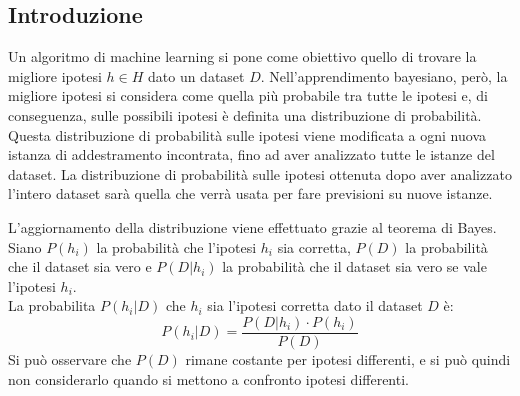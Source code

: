 \subsection{Introduzione}
Un algoritmo di machine learning si pone come obiettivo quello di trovare la
migliore ipotesi $h \in H$ dato un dataset $D$.
Nell'apprendimento bayesiano, però, la migliore ipotesi si considera come
quella più probabile tra tutte le ipotesi e, di conseguenza, sulle possibili
ipotesi è definita una distribuzione di probabilità.
Questa distribuzione di probabilità sulle ipotesi viene modificata a ogni
nuova istanza di addestramento incontrata, fino ad aver analizzato tutte le
istanze del dataset. La distribuzione di probabilità sulle ipotesi ottenuta
dopo aver analizzato l'intero dataset sarà quella che verrà usata per fare
previsioni su nuove istanze.

L'aggiornamento della distribuzione viene effettuato grazie al teorema di
Bayes.\\
Siano $P(h_i)$ la probabilità che l'ipotesi $h_i$ sia corretta, $P(D)$ la
probabilità che il dataset sia vero e $P(D | h_i)$ la probabilità che il
dataset sia vero se vale l'ipotesi $h_i$.\\
La probabilita $P(h_i | D)$ che $h_i$ sia l'ipotesi corretta dato il dataset
$D$ è:
\[
    P(h_i | D) = \frac{P(D | h_i) \cdot P(h_i)}{P(D)}
\]
Si può osservare che $P(D)$ rimane costante per ipotesi differenti, e si può
quindi non considerarlo quando si mettono a confronto ipotesi differenti.

